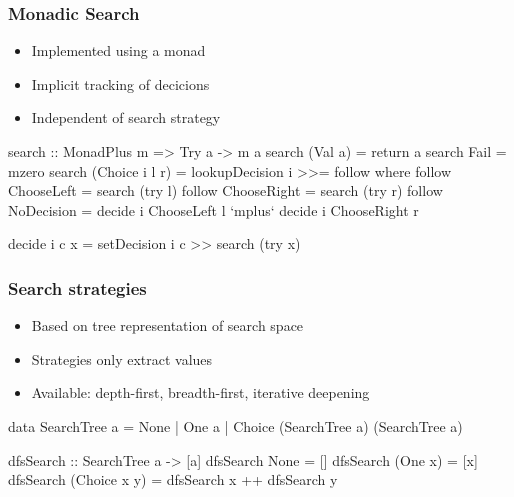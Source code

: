 \documentclass[%
,hyperref={pdfpagelabels=false}
,utf8
]{beamer}
\begin{document}
\begin{frame}[fragile]%
\frametitle{Monadic Search}

\begin{itemize}
  \item Implemented using a  monad
  \item Implicit tracking of decicions
  \item Independent of search strategy
\end{itemize}

\begin{haskell}
search :: MonadPlus m => Try a -> m a
search (Val a)        = return a
search Fail           = mzero
search (Choice i l r) = lookupDecision i >>= follow
  where
  follow ChooseLeft  = search (try l)
  follow ChooseRight = search (try r)
  follow NoDecision  = decide i ChooseLeft  l
               `mplus` decide i ChooseRight r

  decide i c x = setDecision i c >> search (try x)
\end{haskell}
\end{frame}

\begin{frame}[fragile]%
\frametitle{Search strategies}
\begin{itemize}
  \item Based on tree representation of search space
  \item Strategies only extract values
  \item Available: depth-first, breadth-first, iterative deepening
\end{itemize}

\begin{haskell}[SearchTree]
data SearchTree a = None
                  | One a
                  | Choice (SearchTree a) (SearchTree a)
\end{haskell}

\begin{haskell}
dfsSearch :: SearchTree a -> [a]
dfsSearch None         = []
dfsSearch (One      x) = [x]
dfsSearch (Choice x y) = dfsSearch x ++ dfsSearch y
\end{haskell}
\end{frame}
\end{document}
